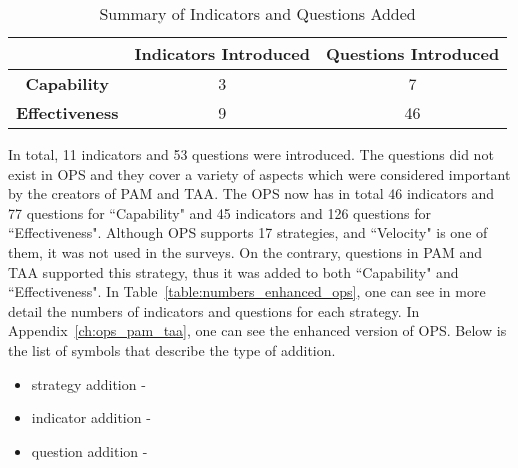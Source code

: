 \begin{table} [H]
	\caption{Summary of Indicators and Questions Added}
	\label{table:summary_questions_added}
	\begin{tabular}{| c | c | c |} \hline
		 & \textbf{Indicators Introduced} & \textbf{Questions Introduced} \\ \hline
		 \textbf{Capability} & 3 & 7 \\ \hline
		 \textbf{Effectiveness} & 9 & 46 \\ \hline
	\end{tabular}
\end{table}

In total, 11 indicators and 53 questions were introduced. The questions did not exist in \ac{OPS} and they cover a variety of aspects which were considered important by the creators of \ac{PAM} and \ac{TAA}. The \ac{OPS} now has in total 46 indicators and 77 questions for ``Capability" and 45 indicators and 126 questions for ``Effectiveness". Although \ac{OPS} supports 17 strategies, and ``Velocity" is one of them, it was not used in the surveys. On the contrary, questions in \ac{PAM} and \ac{TAA} supported this strategy, thus it was added to both ``Capability" and ``Effectiveness". In Table~\ref{table:numbers_enhanced_ops}, one can see in more detail the numbers of indicators and questions for each strategy. In Appendix~\ref{ch:ops_pam_taa}, one can see the enhanced version of \ac{OPS}. Below is the list of symbols that describe the type of addition.

\begin{itemize}
	\item strategy addition - \TwelweStar
	\item indicator addition - \FiveStarOutline
	\item question addition - \FiveStar
\end{itemize}

